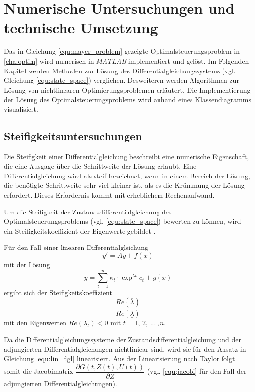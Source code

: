 \chapter{Numerische Untersuchungen und technische Umsetzung} \label{kap:TUNU}
Das in Gleichung \eqref{equ:mayer_problem} gezeigte Optimalsteuerungsproblem in \autoref{cha:optim} wird numerisch in \textit{MATLAB} implementiert und gelöst. Im Folgenden Kapitel werden Methoden zur Lösung des Differentialgleichungssystems (vgl. Gleichung \eqref{equ:state_space}) verglichen. Desweiteren werden Algorithmen zur Lösung von nichtlinearen Optimierungsproblemen erläutert. Die Implementierung der Lösung des Optimalsteuerungsproblems wird anhand eines Klassendiagramms visualisiert.

\section{Steifigkeitsuntersuchungen}
Die Steifigkeit einer Differentialgleichung beschreibt eine numerische Eigenschaft, die eine Ausgage über die Schrittweite der Lösung erlaubt. Eine Differentialgleichung wird als steif bezeichnet, wenn in einem Bereich der Lösung, die benötigte Schrittweite sehr viel kleiner ist, als es die Krümmung der Lösung erfordert. Dieses Erfordernis kommt mit erheblichem Rechenaufwand.

Um die Steifigkeit der Zustandsdifferentialgleichung des Optimalsteuerungsproblems (vgl. \eqref{equ:state_space}) bewerten zu können, wird ein Steifigkeitskoeffizient der Eigenwerte gebildet \cite{Lambert1991}.

Für den Fall einer linearen Differentialgleichung
\begin{equation} \label{equ:lin_dgl}
    y' = Ay+f(x)
\end{equation}
mit der Lösung
\begin{equation}
    y = \sum_{t=1}^n \kappa_t \cdot \exp^{\lambda t} c_t + g(x)
\end{equation}
ergibt sich der Steifigkeitskoeffizient
\begin{equation}
    \frac{Re(\overline{\lambda})}{Re(\underline{\lambda})}
\end{equation}
mit den Eigenwerten \(Re(\lambda_t) < 0\) mit \(t = 1,\,2,\,...\,,n\).

Da die Differentialgleichungssysteme der Zustandsdifferentialgleichung und der adjungierten Differentialgleichungen nichtliniear sind, wird sie für den Ansatz in Gleichung \eqref{equ:lin_dgl} linearisiert. Aus der Linearisierung nach Taylor folgt somit die Jacobimatrix \(\dfrac{\partial G(t,Z(t),U(t))}{\partial Z}\) (vgl. \eqref{equ:jacobi} für den Fall der adjungierten Differentialgleichungen).


